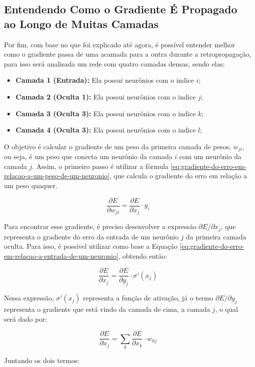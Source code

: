 \subsection{Entendendo Como o Gradiente É Propagado ao Longo de Muitas Camadas}

Por fim, com base no que foi explicado até agora, é possível entender melhor como o gradiente passa de uma acamada para a outra durante a retropropagação, para isso será analisada um rede com quatro camadas densas, sendo elas:

\begin{itemize}
    \item \textbf{Camada 1 (Entrada):} Ela possui neurônios com o indice $i$;
    \item \textbf{Camada 2 (Oculta 1):} Ela possui neurônios com o indice $j$;
    \item \textbf{Camada 3 (Oculta 3):} Ela possui neurônios com o indice $k$;
    \item \textbf{Camada 4 (Oculta 3):} Ela possui neurônios com o indice $l$;
\end{itemize}

O objetivo é calcular o gradiente de um peso da primeira camada de pesos, $w_{ji}$, ou seja, é um peso que conecta um neurônio da camada $i$ com um neurônio da camada $j$. Assim, o primeiro passo é utilizar a fórmula \ref{eq:gradiente-do-erro-em-relacao-a-um-peso-de-um-neuronio}, que calcula o gradiente do erro em relação a um peso quaquer.

\[
    \frac{\partial E}{\partial w_{ji}} = \frac{\partial E}{\partial x_j} \cdot y_i
\]

Para encontrar esse gradiente, é preciso desenvolver a expressão $\partial E / \partial x_j$, que representa o gradiente do erro da entrada de um neurônio $j$ da primeira camada oculta. Para isso, é possível utilizar como base a Equação \ref{eq:gradiente-do-erro-em-relacao-a-entrada-de-um-neuronio}, obtendo então:

\[
    \frac{\partial E}{\partial x_j} = \frac{\partial E}{\partial y_j} \cdot \sigma'(x_j)
\]

Nessa expressão, $\sigma'(x_j)$ representa a função de ativação, já o termo $\partial E / \partial y_j$ representa o gradiente que está vindo da camada de cima, a camada $j$, o qual será dado por:

\[
    \frac{\partial E}{\partial x_j} = \sum_k \frac{\partial E}{\partial x_k} \cdot w_{kj}
\]

Juntando os dois termos:

